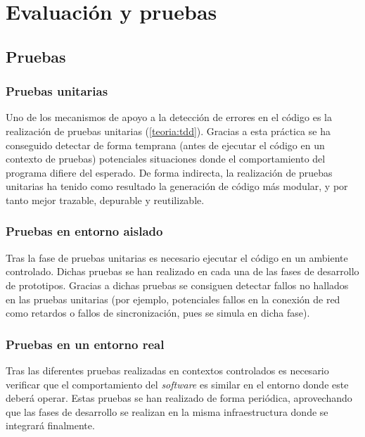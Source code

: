 


\section{Evaluación y pruebas}
\label{chapter:evaluaciones}
\subsection{Pruebas}

\subsubsection{Pruebas unitarias}

Uno de los mecanismos de apoyo a la detección de errores en el código es la realización de pruebas unitarias (\ref{teoria:tdd}). Gracias a esta práctica se ha conseguido detectar de forma temprana (antes de ejecutar el código en un contexto de pruebas) potenciales situaciones donde el comportamiento del programa difiere del esperado. De forma indirecta, la realización de pruebas unitarias ha tenido como resultado la generación de código más modular, y por tanto mejor trazable, depurable y reutilizable.

\subsubsection{Pruebas en entorno aislado}

Tras la fase de pruebas unitarias es necesario ejecutar el código en un ambiente controlado. Dichas pruebas se han realizado en cada una de las fases de desarrollo de prototipos. Gracias a dichas pruebas se consiguen detectar fallos no hallados en las pruebas unitarias (por ejemplo, potenciales fallos en la conexión de red como retardos o fallos de sincronización, pues se simula en dicha fase).

\subsubsection{Pruebas en un entorno real}

Tras las diferentes pruebas realizadas en contextos controlados es necesario verificar que el comportamiento del \textit{software} es similar en el entorno donde este deberá operar. Estas pruebas se han realizado de forma periódica, aprovechando que las fases de desarrollo se realizan en la misma infraestructura donde se integrará finalmente.

